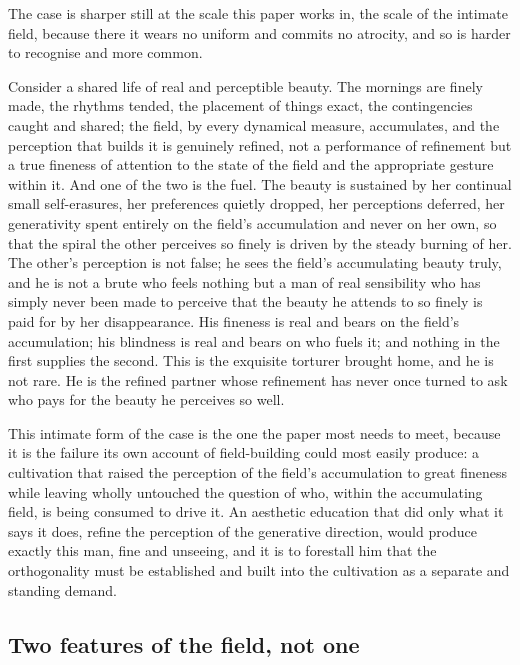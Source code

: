 The case is sharper still at the scale this paper works in, the scale of the intimate field, because there it wears no uniform and commits no atrocity, and so is harder to recognise and more common.

\begin{casebox}
Consider a shared life of real and perceptible beauty. The mornings are finely made, the rhythms tended, the placement of things exact, the contingencies caught and shared; the field, by every dynamical measure, accumulates, and the perception that builds it is genuinely refined, not a performance of refinement but a true fineness of attention to the state of the field and the appropriate gesture within it. And one of the two is the fuel. The beauty is sustained by her continual small self-erasures, her preferences quietly dropped, her perceptions deferred, her generativity spent entirely on the field's accumulation and never on her own, so that the spiral the other perceives so finely is driven by the steady burning of her. The other's perception is not false; he sees the field's accumulating beauty truly, and he is not a brute who feels nothing but a man of real sensibility who has simply never been made to perceive that the beauty he attends to so finely is paid for by her disappearance. His fineness is real and bears on the field's accumulation; his blindness is real and bears on who fuels it; and nothing in the first supplies the second. This is the exquisite torturer brought home, and he is not rare. He is the refined partner whose refinement has never once turned to ask who pays for the beauty he perceives so well.
\end{casebox}

This intimate form of the case is the one the paper most needs to meet, because it is the failure its own account of field-building could most easily produce: a cultivation that raised the perception of the field's accumulation to great fineness while leaving wholly untouched the question of who, within the accumulating field, is being consumed to drive it. An aesthetic education that did only what it says it does, refine the perception of the generative direction, would produce exactly this man, fine and unseeing, and it is to forestall him that the orthogonality must be established and built into the cultivation as a separate and standing demand.

\subsection{Two features of the field, not one}
\label{p22:sub:orth-two-features}

